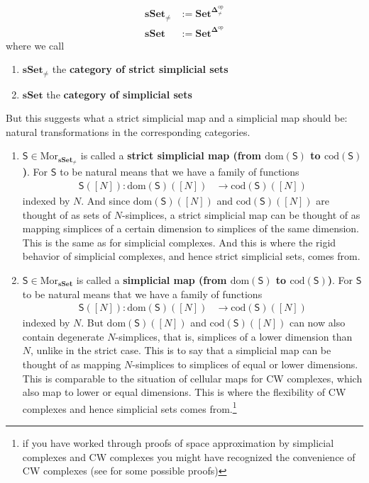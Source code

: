 \begin{align*}
  \mathbf{sSet}_{\neq}
  &:=
  \mathbf{Set}^{\mathbf{\Delta}_{\neq}^{\mathrm{op}}}
  \\
  \mathbf{sSet}
  &:=
  \mathbf{Set}^{\mathbf{\Delta}^{\mathrm{op}}}
\end{align*}
where we call
\begin{enumerate}
\item[(1)]
$\mathbf{sSet}_{\neq}$ the \textbf{category of strict simplicial sets}
\item[(2)]
$\mathbf{sSet}$ the \textbf{category of simplicial sets}
\end{enumerate}
But this suggests what a strict simplicial map and a simplicial map should be: natural transformations in the corresponding categories.
\begin{enumerate}
\item[(1)]
$\mathsf{S} \in \mathrm{Mor}_{\mathbf{sSet}_{\neq}}$ is called a \textbf{strict simplicial map (from $\mathrm{dom}(\mathsf{S})$ to $\mathrm{cod}(\mathsf{S})$)}.
For $\mathsf{S}$ to be natural means that we have a family of functions
\begin{align*}
  \mathsf{S}([N])
  \colon
  \mathrm{dom}(\mathsf{S})([N])
  &\rightarrow
  \mathrm{cod}(\mathsf{S})([N])
\end{align*}
indexed by $N$.
And since $\mathrm{dom}(\mathsf{S})([N])$ and $\mathrm{cod}(\mathsf{S})([N])$ are thought of as sets of $N$-simplices, a strict simplicial map can be thought of as mapping simplices of a certain dimension to simplices of the same dimension.
This is the same as for simplicial complexes.
And this is where the rigid behavior of simplicial complexes, and hence strict simplicial sets, comes from.
\item[(2)]
$\mathsf{S} \in \mathrm{Mor}_{\mathbf{sSet}}$ is called a \textbf{simplicial map (from $\mathrm{dom}(\mathsf{S})$ to $\mathrm{cod}(\mathsf{S})$)}.
For $\mathsf{S}$ to be natural means that we have a family of functions
\begin{align*}
  \mathsf{S}([N])
  \colon
  \mathrm{dom}(\mathsf{S})([N])
  &\rightarrow
  \mathrm{cod}(\mathsf{S})([N])
\end{align*}
indexed by $N$.
But $\mathrm{dom}(\mathsf{S})([N])$ and $\mathrm{cod}(\mathsf{S})([N])$ can now also contain degenerate $N$-simplices, that is, simplices of a lower dimension than $N$, unlike in the strict case.
This is to say that a simplicial map can be thought of as mapping $N$-simplices to simplices of equal or lower dimensions.
This is comparable to the situation of cellular maps for CW complexes, which also map to lower or equal dimensions.
This is where the flexibility of CW complexes and hence simplicial sets comes from.\footnote{if you have worked through proofs of space approximation by simplicial complexes and CW complexes you might have recognized the convenience of CW complexes (see \cite{8b5861fc} for some possible proofs)}
\end{enumerate}
